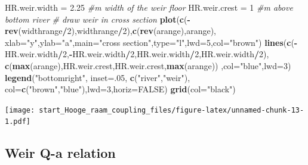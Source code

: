 \documentclass[
]{article}
\newenvironment{Shaded}{\begin{snugshade}}{\end{snugshade}}
\newcommand{\AttributeTok}[1]{\textcolor[rgb]{0.13,0.29,0.53}{#1}}
\newcommand{\CommentTok}[1]{\textcolor[rgb]{0.56,0.35,0.01}{\textit{#1}}}
\newcommand{\ConstantTok}[1]{\textcolor[rgb]{0.56,0.35,0.01}{#1}}
\newcommand{\DecValTok}[1]{\textcolor[rgb]{0.00,0.00,0.81}{#1}}
\newcommand{\FloatTok}[1]{\textcolor[rgb]{0.00,0.00,0.81}{#1}}
\newcommand{\FunctionTok}[1]{\textcolor[rgb]{0.13,0.29,0.53}{\textbf{#1}}}
\newcommand{\NormalTok}[1]{#1}
\newcommand{\OtherTok}[1]{\textcolor[rgb]{0.56,0.35,0.01}{#1}}
\newcommand{\SpecialCharTok}[1]{\textcolor[rgb]{0.81,0.36,0.00}{\textbf{#1}}}
\newcommand{\StringTok}[1]{\textcolor[rgb]{0.31,0.60,0.02}{#1}}
\begin{document}
\begin{Shaded}
\begin{Highlighting}[]
\NormalTok{HR.weir.width }\OtherTok{=} \FloatTok{2.25}  \CommentTok{\#m width of the weir floor }
\NormalTok{HR.weir.crest }\OtherTok{=} \DecValTok{1} \CommentTok{\#m above bottom river}
\CommentTok{\# draw weir in cross section}
\FunctionTok{plot}\NormalTok{(}\FunctionTok{c}\NormalTok{(}\SpecialCharTok{{-}}\FunctionTok{rev}\NormalTok{(widthrange}\SpecialCharTok{/}\DecValTok{2}\NormalTok{),widthrange}\SpecialCharTok{/}\DecValTok{2}\NormalTok{),}\FunctionTok{c}\NormalTok{(}\FunctionTok{rev}\NormalTok{(arange),arange),}
     \AttributeTok{xlab=}\StringTok{"y"}\NormalTok{,}\AttributeTok{ylab=}\StringTok{"a"}\NormalTok{,}\AttributeTok{main=}\StringTok{"cross section"}\NormalTok{,}\AttributeTok{type=}\StringTok{"l"}\NormalTok{,}\AttributeTok{lwd=}\DecValTok{5}\NormalTok{,}\AttributeTok{col=}\StringTok{"brown"}\NormalTok{)}
\FunctionTok{lines}\NormalTok{(}\FunctionTok{c}\NormalTok{(}\SpecialCharTok{{-}}\NormalTok{HR.weir.width}\SpecialCharTok{/}\DecValTok{2}\NormalTok{,}\SpecialCharTok{{-}}\NormalTok{HR.weir.width}\SpecialCharTok{/}\DecValTok{2}\NormalTok{,HR.weir.width}\SpecialCharTok{/}\DecValTok{2}\NormalTok{,HR.weir.width}\SpecialCharTok{/}\DecValTok{2}\NormalTok{),}
      \FunctionTok{c}\NormalTok{(}\FunctionTok{max}\NormalTok{(arange),HR.weir.crest,HR.weir.crest,}\FunctionTok{max}\NormalTok{(arange))}
\NormalTok{      ,}\AttributeTok{col=}\StringTok{"blue"}\NormalTok{,}\AttributeTok{lwd=}\DecValTok{3}\NormalTok{)}
\FunctionTok{legend}\NormalTok{(}\StringTok{"bottomright"}\NormalTok{, }\AttributeTok{inset=}\NormalTok{.}\DecValTok{05}\NormalTok{,}
       \FunctionTok{c}\NormalTok{(}\StringTok{"river"}\NormalTok{,}\StringTok{"weir"}\NormalTok{), }\AttributeTok{col=}\FunctionTok{c}\NormalTok{(}\StringTok{"brown"}\NormalTok{,}\StringTok{"blue"}\NormalTok{),}\AttributeTok{lwd=}\DecValTok{3}\NormalTok{,}\AttributeTok{horiz=}\ConstantTok{FALSE}\NormalTok{)}
\FunctionTok{grid}\NormalTok{(}\AttributeTok{col=}\StringTok{"black"}\NormalTok{)}
\end{Highlighting}
\end{Shaded}

\texttt{[image: start\_Hooge\_raam\_coupling\_files/figure-latex/unnamed-chunk-13-1.pdf]}

\hypertarget{weir-q-a-relation}{%
\subsection{Weir Q-a relation}\label{weir-q-a-relation}}
\end{document}
